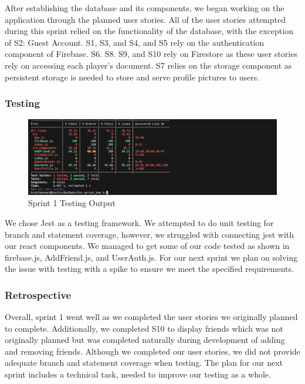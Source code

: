 After establishing the database and its components, we began working on the application through the planned user stories. All of the user stories attempted during this sprint relied on the functionality of the database, with the exception of S2: Guest Account. S1, S3, and S4, and S5 rely on the authentication component of Firebase. S6. S8. S9, and S10 rely on Firestore as these user stories rely on accessing each player's document. S7 relies on the storage component as persistent storage is needed to store and serve profile pictures to users. 

\subsubsection {Testing}
\begin{figure}[h]
    \centering
    \includegraphics[width=1\linewidth]{figures/Testing-2.png}
    \caption{Sprint 1 Testing Output}
    \label{fig:enter-label}
\end{figure}

    We chose Jest as a testing framework. We attempted to do unit testing for branch and statement coverage, however, we struggled with connecting jest with our react components. We managed to get some of our code tested as shown in firebase.js, AddFriend.js, and UserAuth.js. For our next sprint we plan on solving the issue with testing with a spike to ensure we meet the specified requirements. 


\subsubsection{Retrospective}

Overall, sprint 1 went well as we completed the user stories we originally planned to complete. Additionally, we completed S10 to display friends which was not originally planned but was completed naturally during development of adding and removing friends. Although we completed our user stories, we did not provide adequate branch and statement coverage when testing. The plan for our next sprint includes a technical task, needed to improve our testing as a whole. 

